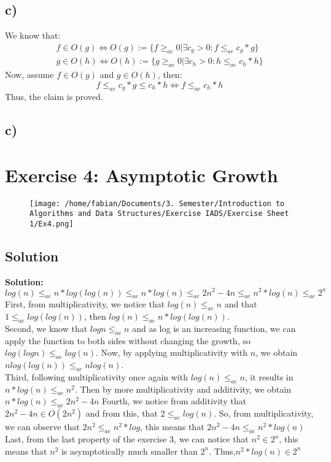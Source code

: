 \documentclass[a4paper,11pt]{article}
\begin{document}
	\subsection*{c)}
	
	We know that:
	\begin{align*}
		f \in O(g) \Leftrightarrow O(g) := \{f \ge_{ae} 0 | \exists c_g > 0 : f \le_{ae} c_g*g  \} \\
		g \in O(h) \Leftrightarrow O(h) := \{g \ge_{ae} 0 | \exists c_h > 0 : h \le_{ae} c_h*h \} 
	\end{align*}
	Now, assume \(f \in O(g)\) and \(g \in O(h)\), then:
	\[
		f \le_{ae} c_g*g \le c_h*h \Leftrightarrow f \le_{ae} c_h*h
	\]
	Thus, the claim is proved.
	
	\subsection*{c)}
	
	
	
	\section*{Exercise 4: Asymptotic Growth}
	
	\begin{figure}[htpb]
		\centering
		\texttt{[image: /home/fabian/Documents/3. Semester/Introduction to Algorithms and Data Structures/Exercise IADS/Exercise Sheet 1/Ex4.png]}
	\end{figure}
	
	\subsection*{Solution}
	\textbf{Solution:} \\
	\[ 
	log (n) \le_{ae} n * log (log(n)) \le_{ae} n*log(n)   \le_{ae} 2n^2 - 4n \le_{ae} n^2 * log(n)\le_{ae} 2^n
	\]
	First, from multiplicativity, we notice that \(log(n) \le_{ae} n\) and that \(1 \le_{ae} log(log(n)) \), then \(log(n) \le_{ae} n * log(log(n)) \). \\
	Second, we know that \(log n \le_{ae} n\) and as log is an increasing function, we can apply the function to both sides without changing the growth, so \(log(log n) \le_{ae} log(n)\). Now, by applying  multiplicativity with \(n\), we obtain \(n log(log(n)) \le_{ae} n log(n)\). \\
	Third, following multiplicativity once again with \(log(n) \le_{ae} n\), it results in \(n* log(n)\le_{ae} n^2\). Then by more multiplicativity and additivity, we obtain \(n*log(n) \le_{ae} 2n^2 - 4n\) 
	Fourth, we notice from additivity that \(2n^2 - 4n \in O(2n^2)\) and from this, that \(2 \le_{ae} log(n)\). So, from multiplicativity, we can observe that  \(2n^2 \le_{ae} n^2*log\), this means that \(2n^2 - 4n  \le_{ae} n^2*log(n)\)\\
	Last, from the last property of the exercise 3, we can notice that $n^2 \in 2^n$, this means that $n^2$ is asymptotically much smaller than $2^n$. Thus,$n^2 * log(n) \in 2^n$
	
	
	
\end{document}

